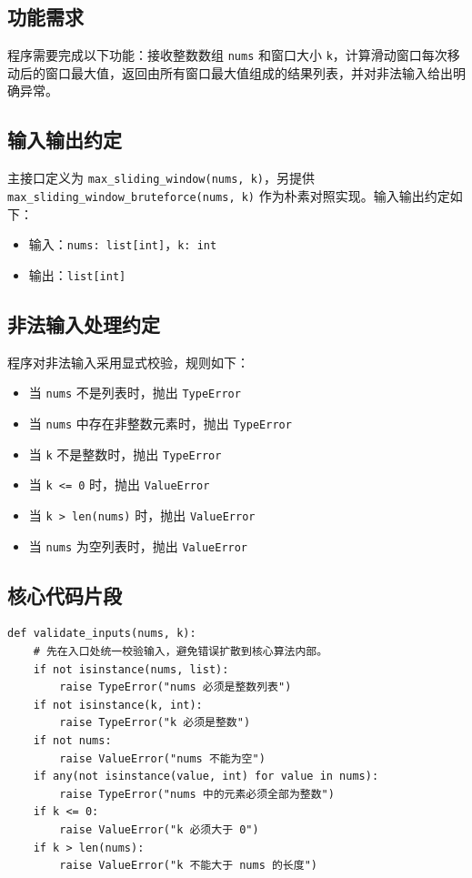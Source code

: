 \documentclass[a4paper,UTF8,fontset=none]{ctexart}
\begin{document}
\subsection{功能需求}

程序需要完成以下功能：接收整数数组 \texttt{nums} 和窗口大小 \texttt{k}，计算滑动窗口每次移动后的窗口最大值，返回由所有窗口最大值组成的结果列表，并对非法输入给出明确异常。

\subsection{输入输出约定}

主接口定义为 \texttt{max\_sliding\_window(nums, k)}，另提供 \texttt{max\_sliding\_window\_bruteforce(nums, k)} 作为朴素对照实现。输入输出约定如下：

\begin{itemize}
    \item 输入：\texttt{nums: list[int]}，\texttt{k: int}
    \item 输出：\texttt{list[int]}
\end{itemize}

\subsection{非法输入处理约定}

程序对非法输入采用显式校验，规则如下：

\begin{itemize}
    \item 当 \texttt{nums} 不是列表时，抛出 \texttt{TypeError}
    \item 当 \texttt{nums} 中存在非整数元素时，抛出 \texttt{TypeError}
    \item 当 \texttt{k} 不是整数时，抛出 \texttt{TypeError}
    \item 当 \texttt{k <= 0} 时，抛出 \texttt{ValueError}
    \item 当 \texttt{k > len(nums)} 时，抛出 \texttt{ValueError}
    \item 当 \texttt{nums} 为空列表时，抛出 \texttt{ValueError}
\end{itemize}

\subsection{核心代码片段}

\begin{lstlisting}[title=输入校验]
def validate_inputs(nums, k):
    # 先在入口处统一校验输入，避免错误扩散到核心算法内部。
    if not isinstance(nums, list):
        raise TypeError("nums 必须是整数列表")
    if not isinstance(k, int):
        raise TypeError("k 必须是整数")
    if not nums:
        raise ValueError("nums 不能为空")
    if any(not isinstance(value, int) for value in nums):
        raise TypeError("nums 中的元素必须全部为整数")
    if k <= 0:
        raise ValueError("k 必须大于 0")
    if k > len(nums):
        raise ValueError("k 不能大于 nums 的长度")
\end{lstlisting}
\end{document}

